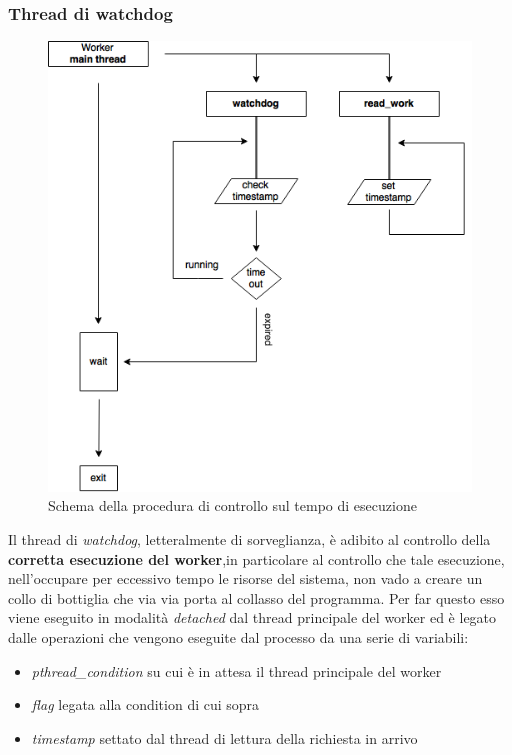 \documentclass[italian]{tktltiki2}
\begin{document}
\subsubsection{Thread di watchdog}
\label{sec:watchdog}
\begin{figure}[h]
\centering
\includegraphics[width=\textwidth]{images/watchdog}
\caption{Schema della procedura di controllo sul tempo di esecuzione \label{fig: watchdog}}
\end{figure}
Il thread di \emph{watchdog}, letteralmente di sorveglianza, è adibito al controllo della \textbf{corretta esecuzione del worker},in particolare al controllo che tale esecuzione, nell'occupare per eccessivo tempo le risorse del sistema, non vado a creare un collo di bottiglia che via via porta al collasso del programma. Per far questo esso viene eseguito in modalità \emph{detached} dal thread principale del worker ed è legato dalle operazioni che vengono eseguite dal processo da una serie di variabili: 
\begin{itemize}
  \item \emph{pthread\_condition} su cui è in attesa il thread principale del worker
  \item \emph{flag} legata alla condition di cui sopra
  \item \emph{timestamp} settato dal thread di lettura della richiesta in arrivo
\end{itemize}
\end{document}
